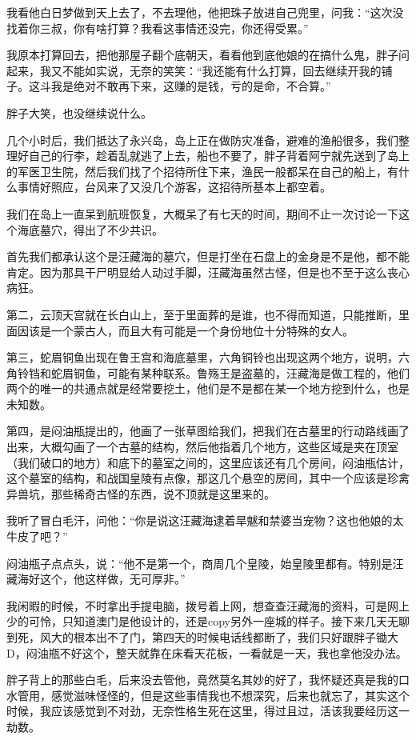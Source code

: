 我看他白日梦做到天上去了，不去理他，他把珠子放进自己兜里，问我：“这次没找着你三叔，你有啥打算？我看这事情还没完，你还得受累。”

我原本打算回去，把他那屋子翻个底朝天，看看他到底他娘的在搞什么鬼，胖子问起来，我又不能如实说，无奈的笑笑：“我还能有什么打算，回去继续开我的铺子。这斗我是绝对不敢再下来，这赚的是钱，亏的是命，不合算。”

胖子大笑，也没继续说什么。

几个小时后，我们抵达了永兴岛，岛上正在做防灾准备，避难的渔船很多，我们整理好自己的行李，趁着乱就逃了上去，船也不要了，胖子背着阿宁就先送到了岛上的军医卫生院，然后我们找了个招待所住下来，渔民一般都呆在自己的船上，有什么事情好照应，台风来了又没几个游客，这招待所基本上都空着。

我们在岛上一直呆到航班恢复，大概呆了有七天的时间，期间不止一次讨论一下这个海底墓穴，得出了不少共识。

首先我们都承认这个是汪藏海的墓穴，但是打坐在石盘上的金身是不是他，都不能肯定。因为那具干尸明显给人动过手脚，汪藏海虽然古怪，但是也不至于这么丧心病狂。

第二，云顶天宫就在长白山上，至于里面葬的是谁，也不得而知道，只能推断，里面因该是一个蒙古人，而且大有可能是一个身份地位十分特殊的女人。

第三，蛇眉铜鱼出现在鲁王宫和海底墓里，六角铜铃也出现这两个地方，说明，六角铃铛和蛇眉铜鱼，可能有某种联系。鲁殇王是盗墓的，汪藏海是做工程的，他们两个的唯一的共通点就是经常要挖土，他们是不是都在某一个地方挖到什么，也是未知数。

第四，是闷油瓶提出的，他画了一张草图给我们，把我们在古墓里的行动路线画了出来，大概勾画了一个古墓的结构，然后他指着几个地方，这些区域是夹在顶室（我们破口的地方）和底下的墓室之间的，这里应该还有几个房间，闷油瓶估计，这个墓室的结构，和战国皇陵有点像，那这几个悬空的房间，其中一个应该是珍禽异兽坑，那些稀奇古怪的东西，说不顶就是这里来的。

我听了冒白毛汗，问他：“你是说这汪藏海逮着旱魃和禁婆当宠物？这也他娘的太牛皮了吧？”

闷油瓶子点点头，说：“他不是第一个，商周几个皇陵，始皇陵里都有。特别是汪藏海好这个，他这样做，无可厚非。”

我闲暇的时候，不时拿出手提电脑，拨号着上网，想查查汪藏海的资料，可是网上少的可怜，只知道澳门是他设计的，还是copy另外一座城的样子。接下来几天无聊到死，风大的根本出不了门，第四天的时候电话线都断了，我们只好跟胖子锄大D，闷油瓶不好这个，整天就靠在床看天花板，一看就是一天，我也拿他没办法。

胖子背上的那些白毛，后来没去管他，竟然莫名其妙的好了，我怀疑还真是我的口水管用，感觉滋味怪怪的，但是这些事情我也不想深究，后来也就忘了，其实这个时候，我应该感觉到不对劲，无奈性格生死在这里，得过且过，活该我要经历这一劫数。

